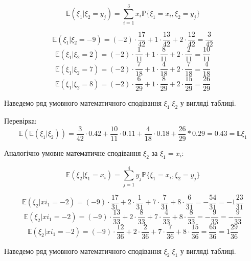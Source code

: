 \documentclass[14pt, a4paper, ukrainian]{extreport}
\begin{document}
	$$\mathbb{E}(\xi_1|\xi_2 = y_j) = \sum_{i=1}^{3}x_i\mathbb{P}\{\xi_1=x_i, \xi_2 = y_j\}$$
	
	$$\mathbb{E}(\xi_1|\xi_2 = -9) = (-2)\cdot \frac{17}{42} + 1 \cdot \frac{13}{42} + 2 \cdot \frac{12}{42} = \frac{3}{42}$$
	$$\mathbb{E}(\xi_1|\xi_2 = 2) = (-2)\cdot \frac{1}{11} + 1 \cdot \frac{8}{11} + 2 \cdot \frac{2}{11} = \frac{10}{11}$$
	$$\mathbb{E}(\xi_1|\xi_2 = 7) = (-2)\cdot \frac{7}{18} + 1 \cdot \frac{4}{18} + 2 \cdot \frac{7}{18} = \frac{4}{18}$$
	$$\mathbb{E}(\xi_1|\xi_2 = 8) = (-2)\cdot \frac{6}{29} + 1 \cdot \frac{8}{29} + 2 \cdot \frac{15}{29} = \frac{26}{29}$$
	
	Наведемо ряд умовного математичного сподівання $\xi_1|\xi_2$ у вигляді таблиці.
	\begin{table}[H]
		\caption{\label{tab:E1|E2}Умовне математичне сподівання $\xi_1|\xi_2=y_j$}
		\begin{center}
		\end{center}	
	\end{table}
	
	Перевірка:
	$$\mathbb{E}(\mathbb{E}(\xi_1|\xi_2)) = \frac{3}{42} \cdot 0.42 + \frac{10}{11} \cdot 0.11 + \frac{4}{18} \cdot 0.18 + \frac{26}{29} * 0.29 = 0.43 = \mathbb{E}\xi_1$$
	
	Аналогічно умовне математичне сподівання $\xi_2$ за $\xi_1=x_i$:
	
	$$\mathbb{E}(\xi_2|\xi_1 = x_i) = \sum_{j=1}^{4}y_j\mathbb{P}\{\xi_1=x_i, \xi_2 = y_j\}$$
	
	$$ \mathbb{E}(\xi_2|xi_1=-2) = (-9) \cdot \frac{17}{31} + 2 \cdot \frac{1}{31} + 7 \cdot \frac{7}{31} + 8 \cdot \frac{6}{31} = -\frac{54}{31} = -1\frac{23}{31}$$
	$$ \mathbb{E}(\xi_2|xi_1=-2) = (-9) \cdot \frac{13}{33} + 2 \cdot \frac{8}{33} + 7 \cdot \frac{4}{33} + 8 \cdot \frac{8}{33} = -\frac{9}{33} = -\frac{9}{33}$$
	$$ \mathbb{E}(\xi_2|xi_1=-2) = (-9) \cdot \frac{12}{36} + 2 \cdot \frac{2}{36} + 7 \cdot \frac{7}{36} + 8 \cdot \frac{15}{36} = \frac{65}{36} = 1\frac{29}{36}$$
	
	Наведемо ряд умовного математичного сподівання $\xi_2|\xi_1$ у вигляді таблиці.
	\begin{table}[H]
		\caption{\label{tab:E2|E1}Умовне математичне сподівання $\xi_2|\xi_1=x_i$}
		\begin{center}
		\end{center}	
	\end{table}
	
\end{document}
